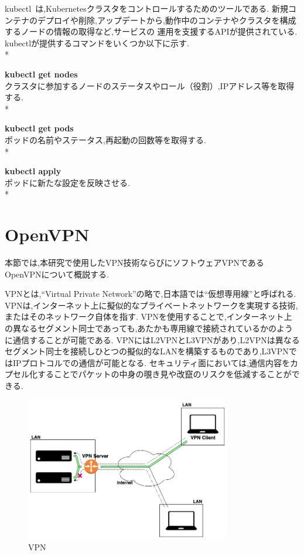 kubectl~\cite{kubectl}は,Kubernetesクラスタをコントロールするためのツールである.
新規コンテナのデプロイや削除,アップデートから,動作中のコンテナやクラスタを構成するノードの情報の取得など,サービスの
運用を支援するAPIが提供されている.
kubectlが提供するコマンドをいくつか以下に示す.\\*

{\bf kubectl get nodes}\\
クラスタに参加するノードのステータスやロール（役割）,IPアドレス等を取得する.\\*

{\bf kubectl get pods}\\
ポッドの名前やステータス,再起動の回数等を取得する.\\*

{\bf kubectl apply}\\
ポッドに新たな設定を反映させる.\\*

\section{OpenVPN}
\label{background:openvpn}

本節では,本研究で使用したVPN技術ならびにソフトウェアVPNであるOpenVPNについて概説する.

VPNとは,``Virtual Private Network''の略で,日本語では``仮想専用線''と呼ばれる.
VPNは,インターネット上に擬似的なプライベートネットワークを実現する技術,またはそのネットワーク自体を指す.
VPNを使用することで,インターネット上の異なるセグメント同士であっても,あたかも専用線で接続されているかのように通信することが可能である.
VPNにはL2VPNとL3VPNがあり,L2VPNは異なるセグメント同士を接続しひとつの擬似的なLANを構築するものであり,L3VPNではIPプロトコルでの通信が可能となる.
セキュリティ面においては,通信内容をカプセル化することでパケットの中身の覗き見や改竄のリスクを低減することができる.

\begin{figure}[htbp]
\begin{center}
    \includegraphics[width=0.8\textwidth]{./figures/openvpn.jpg}
    \caption{VPN}
\end{center}
\end{figure}

